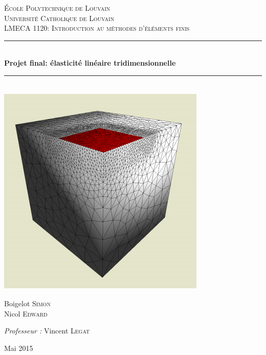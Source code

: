 \documentclass[12pt]{report}
\newcommand{\HRule}{\rule{\linewidth}{0.5mm}}
\begin{document}
\begin{titlepage}
  \begin{sffamily}
  \begin{center}
    \textsc{\LARGE École Polytechnique de Louvain\\Université Catholique de Louvain}\\[2cm]
    \textsc{\Large LMECA 1120: Introduction au méthodes d'éléments finis}\\[1.5cm]
    \HRule \\[0.4cm]
    { \huge \bfseries Projet final: élasticité linéaire tridimensionnelle\\[0.4cm] }
    \HRule \\[0.4cm]
   \vfill
   \includegraphics[scale=1]{cube}
   \vfill    
    \begin{minipage}{0.4\textwidth}
      \begin{flushleft} \large
        Boigelot \textsc{Simon}\\
        Nicol \textsc{Edward}\\
      \end{flushleft}
    \end{minipage}
    \begin{minipage}{0.4\textwidth}
      \begin{flushright} \large
        \emph{Professeur :} Vincent \textsc{Legat}\\
      \end{flushright}
    \end{minipage}
    \vfill
    {\large Mai 2015}
  \end{center}
  \end{sffamily}
\end{titlepage}
\end{document}
